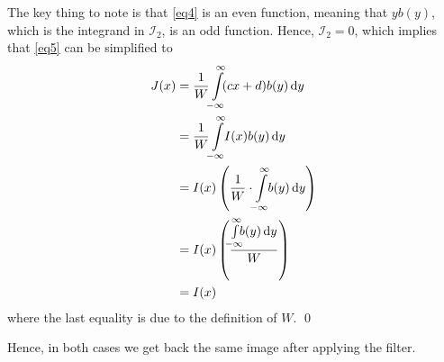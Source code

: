 \documentclass[a4paper]{article}
\begin{document}
\begin{enumerate}
The key thing to note is that \eqref{eq4} is an even function, meaning that $y b(y)$, which is the integrand in $\mathcal{I}_2$, is an odd function. Hence, $\mathcal{I}_2 = 0$, which implies that \eqref{eq5} can be simplified to
\begin{align*}
J(x) &= \dfrac{1}{W}\int\limits_{\mathclap{-\infty}}^{\mathclap{\infty}}\! (cx + d) b(y)\, \mathrm{d}y \\
&= \dfrac{1}{W}\int\limits_{\mathclap{-\infty}}^{\mathclap{\infty}}\! I(x) b(y)\, \mathrm{d}y \\
&= I(x) \left (\dfrac{1}{W}\cdot \int\limits_{\mathclap{-\infty}}^{\mathclap{\infty}}\! b(y)\, \mathrm{d}y \right ) \\
&= I(x) \left (\dfrac{\int\limits_{\mathclap{-\infty}}^{\mathclap{\infty}}\! b(y)\, \mathrm{d}y}{W}\right ) \\
&= I(x)
\end{align*}
where the last equality is due to the definition of $W$. \qed
\end{enumerate}
Hence, in both cases we get back the same image after applying the filter.
\end{document}

